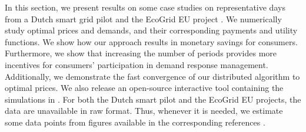 

In this section, we present results on some case studies on representative days from a Dutch smart grid pilot \cite{dutch} and the EcoGrid EU project \cite{ecogrid}. We numerically study optimal prices and demands, and their corresponding payments and utility functions. We show how our approach results in monetary savings for consumers. Furthermore, we show that increasing the number of periods provides more incentives for consumers' participation in demand response management. Additionally, we demonstrate the fast convergence of our distributed algorithm to optimal prices. We also release an open-source interactive tool containing the simulations in \cite{tool2}. For both the Dutch smart pilot and the EcoGrid EU projects, the data are unavailable in raw format. Thus, whenever it is needed, we estimate some data points from figures available in the corresponding references \cite{dutch,ecogrid}. 

